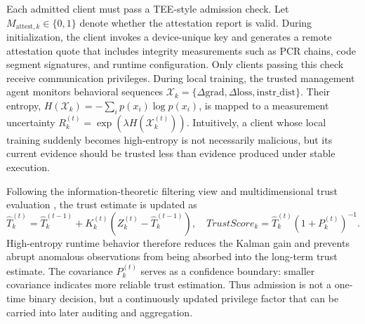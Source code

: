 \documentclass[runningheads,orivec]{llncs}
\begin{document}
Each admitted client must pass a TEE-style admission check. Let $M_{\text{attest},k}\in\{0,1\}$ denote whether the attestation report is valid. During initialization, the client invokes a device-unique key and generates a remote attestation quote that includes integrity measurements such as PCR chains, code segment signatures, and runtime configuration. Only clients passing this check receive communication privileges. During local training, the trusted management agent monitors behavioral sequences
$\mathcal{X}_k=\{\Delta\text{grad},\Delta\text{loss},\text{instr\_dist}\}$. Their entropy, $H(\mathcal{X}_k)=-\sum_i p(x_i)\log p(x_i)$, is mapped to a measurement uncertainty $R_k^{(t)}=\exp(\lambda H(\mathcal{X}_k^{(t)}))$. Intuitively, a client whose local training suddenly becomes high-entropy is not necessarily malicious, but its current evidence should be trusted less than evidence produced under stable execution.

Following the information-theoretic filtering view \cite{chen2017maximum} and multidimensional trust evaluation \cite{li2026multidimensional}, the trust estimate is updated as
\begin{equation}
    \hat{T}_{k}^{(t)}=\hat{T}_{k}^{(t-1)}+K_k^{(t)}(Z_k^{(t)}-\hat{T}_{k}^{(t-1)}),\quad
    TrustScore_k=\hat{T}_{k}^{(t)}(1+P_k^{(t)})^{-1}.
\end{equation}
High-entropy runtime behavior therefore reduces the Kalman gain and prevents abrupt anomalous observations from being absorbed into the long-term trust estimate. The covariance $P_k^{(t)}$ serves as a confidence boundary: smaller covariance indicates more reliable trust estimation. Thus admission is not a one-time binary decision, but a continuously updated privilege factor that can be carried into later auditing and aggregation.
\end{document}
